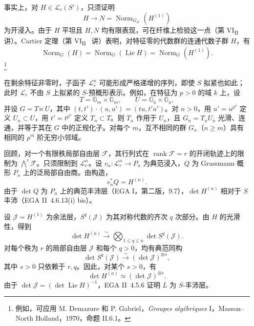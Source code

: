 事实上，对 \(H\in\mathcal L_r(S')\)，只须证明
\[
  H\longrightarrow N=\operatorname{Norm}_{G_{S'}}(H^{(1)})
\]
为开浸入。由于 \(H\) 平坦且 \(H,N\) 均有限表现，可在纤维上检验这一点（第 VI\textsubscript{B}~ 讲）。Cartier 定理（第 VI\textsubscript{B}~ 讲）表明，对特征零的代数群的连通代数子群 \(H\)，有
\[
 \operatorname{Norm}_G(H)
 =\operatorname{Norm}_G(\operatorname{Lie}H)
 =\operatorname{Norm}_G(H^{(1)}).
\]
\footnote{例如，可应用 M. Demazure 和 P. Gabriel，\emph{Groupes algébriques} I，Masson--North Holland，1970，命题 II.6.1。}

在剩余特征非零时，子函子 \(\mathcal L_r^n\) 可能形成严格递增的序列，即使 \(S\) 拟紧也如此；此时 \(\mathcal L_r\) 不由 \(S\) 上拟紧的 \(S\)-预概形表示。例如，在特征为 \(p>0\) 的域 \(k\) 上，设
\[
 T=\mathbb G_m\times\mathbb G_m,\qquad
 U=\mathbb G_a\times\mathbb G_a,
\]
并设 \(G=T\ltimes U\)，其中 \((t,t')\cdot(u,u')=(tu,t'u')\)。对 \(n>0\)，用 \(u'=u^{p^n}\) 定义 \(U_n\subset U\)，用 \(t'=t^{p^n}\) 定义 \(T_n\subset T\)。则 \(T_n\) 作用于 \(U_n\)，且 \(G_n=T_nU_n\) 光滑、连通，并等于其在 \(G\) 中的正规化子。对每个 \(m\)，互不相同的群 \(G_n\)（\(n\geq m\)）具有相同的 \(p^m\) 阶无穷小邻域。


回顾，对一个有限秩局部自由层 \(\mathcal F\)，其行列式在 \(\operatorname{rank}\mathcal F=r\) 的开闭轨迹上的限制为 \(\bigwedge^r\mathcal F\)。只须限制到 \(\mathcal L_r^n\)。设 \(v_n:\mathcal L_r^n\to P_n\) 为典范浸入，\(Q\) 为 Grassmann 概形 \(P_n\) 上的泛局部自由商。由构造，
\[
  v_n^*Q=H^{(n)}.
\]
由于 \(\det Q\) 为 \(P_n\) 上的典范丰沛层（EGA I，第二版，9.7），\(\det H^{(n)}\) 相对于 \(S\) 丰沛（EGA II~4.6.13(i) bis）。

设 \(\mathcal J=H^{(1)}\) 为余法层，\(S^q(\mathcal J)\) 为其对称代数的齐次 \(q\) 次部分。由 \(H\) 的光滑性，得到
\[
  \det H^{(n)}
  \xrightarrow{\sim}
  \bigotimes_{1\leq q\leq n}\det S^q(\mathcal J).
\]
对每个秩为 \(r\) 的局部自由层 \(\mathcal J\) 和每个 \(q>0\)，均有典范同构
\[
  \det S^q(\mathcal J)
  \xrightarrow{\sim}
  (\det\mathcal J)^{\otimes s},
\]
其中 \(s>0\) 只依赖于 \(r,q\)。因此，对某个 \(s>0\)，有
\[
  \det H^{(n)}\simeq(\det\mathcal J)^{\otimes s}.
\]
由于 \(\det\mathcal J=(\det\operatorname{Lie}H)^{-1}\)，EGA II~4.5.6 证明 \(L\) 为 \(S\)-丰沛层。

